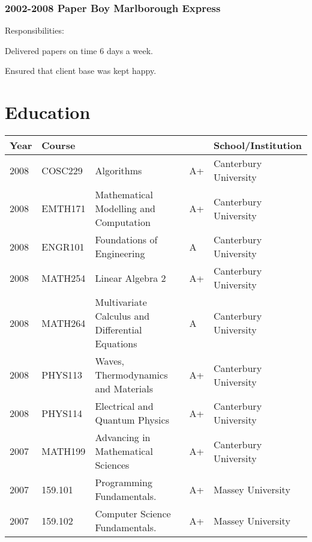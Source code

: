 \documentclass[10pt]{article}
\newenvironment{packed_items}{
    \begin{itemize}
    \setlength{\itemsep}{1pt}
    \setlength{\parskip}{0pt}
    \setlength{\parsep}{0pt}
}{\end{itemize}}
\begin{document}
        \subsubsection*{2002-2008 \quad Paper Boy \quad Marlborough Express}\small
            Responsibilities:
            \begin{packed_items}
                \item{Delivered papers on time 6 days a week.}
                \item{Ensured that client base was kept happy.}
            \end{packed_items}
    \section*{Education}
    {\footnotesize{}
        \begin{tabularx}{\textwidth}{llXl|l}
            \hline
            \textbf{Year} & \textbf{Course} & & & \textbf{School/Institution} \\
            \hline
            2008 & COSC229 & Algorithms                                         & A+ & Canterbury University\\
            2008 & EMTH171 & Mathematical Modelling and Computation             & A+ & Canterbury University\\
            2008 & ENGR101 & Foundations of Engineering                         & A  & Canterbury University\\
            2008 & MATH254 & Linear Algebra 2                                   & A+ & Canterbury University\\
            2008 & MATH264 & Multivariate Calculus and Differential Equations   & A  & Canterbury University\\
            2008 & PHYS113 & Waves, Thermodynamics and Materials                & A+ & Canterbury University\\
            2008 & PHYS114 & Electrical and Quantum Physics                     & A+ & Canterbury University\\
            \hline
            2007 & MATH199           & Advancing in Mathematical Sciences       & A+ & Canterbury University\\
            2007 & 159.101           & Programming Fundamentals.                             & A+ & Massey University         \\
            2007 & 159.102           & Computer Science Fundamentals.                        & A+ & Massey University\\

\end{tabularx}}
\end{document}
